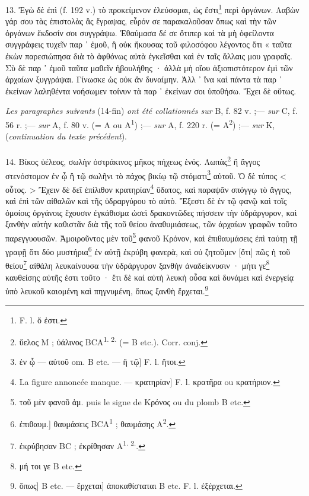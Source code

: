 \documentclass[a4paper, 11pt, oneside, polutonikogreek, french]{article}
\begin{document}
13. Ἐγὼ δὲ ἐπὶ (f. 192 v.) τὸ προκείμενον ἐλεύσομαι, ὡς ἔστι\footnote{F. l. ὅ ἐστι.} περὶ ὀργάνων. Λαβὼν γάρ σου τὰς ἐπιστολὰς ἃς ἔγραψας, εὗρόν σε παρακαλοῦσαν ὅπως καὶ τὴν τῶν ὀργάνων ἔκδοσίν σοι συγγράψω. Ἐθαύμασα δέ σε ὅτιπερ καὶ τὰ μὴ ὀφείλοντα συγγράφεις τυχεῖν παρ ᾽ ἐμοῦ, ἢ οὐκ ἤκουσας τοῦ φιλοσόφου λέγοντος ὅτι « ταῦτα ἐκὼν παρεσιώπησα διὰ τὸ ἀφθόνως αὐτὰ ἐγκεῖσθαι καὶ ἐν ταῖς ἄλλαις μου γραφαῖς. Σὺ δὲ παρ ᾽ ἐμοῦ ταῦτα μαθεῖν ἠβουλήθης · ἀλλὰ μὴ οἴου ἀξιοπιστότερον ἐμὶ τῶν ἀρχαίων ξυγγράψαι. Γίνωσκε ὡς οὐκ ἂν δυναίμην. Ἀλλ ᾽ ἵνα καὶ πάντα τὰ παρ ᾽ ἐκείνων λαληθέντα νοήσωμεν τοίνυν τὰ παρ ᾽ ἐκείνων σοι ὑποθήσω. Ἔχει δὲ οὕτως.
\begin{center}
\emph{Les paragraphes suiνants} (14-fin) \emph{ont été collationnés sur} B, f. 82 v. ;--- \emph{sur} C, f. 56 r. ;--- \emph{sur} A, f. 80 v. (= A ou A\textsuperscript{1}) ;--- \emph{sur} A, f. 220 r. (= A\textsuperscript{2}) ;--- \emph{sur} K, (\emph{continuation du texte précédent}).
\end{center}
\paragraph{}
14. Βίκος ὑέλεος, σωλὴν ὀστράκινος μῆκος πήχεως ἑνός. Λωπὰς\footnote{ὕελος M ; ὑάλινος BCA\textsuperscript{1. 2.} (= B etc.). Corr. conj.} ἢ ἄγγος στενόστομον ἐν ᾧ ἢ τῷ σωλῆνι τὸ πάχος βικίῳ τῷ στόματι\footnote{ἐν ᾧ --- αὐτοῦ om. B etc. --- ἢ τῷ] F. l. ἤτοι.} αὐτοῦ. Ὁ δὲ τύπος < οὗτος. > Ἔχειν δὲ δεῖ ἐπίλιθον κρατηρίαν\footnote{La figure annoncée manque. --- κρατηρίαν] F. l. κρατῆρα ou κρατήριον.} ὕδατος, καὶ παραψᾶν σπόγγῳ τὸ ἄγγος, καὶ ἐπὶ τῶν αἰθαλῶν καὶ τῆς ὑδραργύρου τὸ αὐτὸ. Ἔξεστι δὲ ἐν τῷ φανῷ καὶ τοῖς ὁμοίοις ὀργάνοις ἔχουσιν ἐγκάθισμα ὡσεὶ δρακοντῶδες πήσσειν τὴν ὑδράργυρον, καὶ ξανθὴν αὐτὴν καθιστᾶν διὰ τῆς τοῦ θείου ἀναθυμιάσεως, τῶν ἀρχαίων γραφῶν τοῦτο παρεγγυουσῶν. Ἀμοιροῦντος μὲν τοῦ\footnote{τοῦ μὲν φανοῦ ἀμ. puis le signe de Κρόνος ou du plomb B etc.} φανοῦ Κρόνον, καὶ ἐπιθαυμάσεις ἐπὶ ταύτῃ τῇ γραφῇ ὅτι δύο μυστήρια\footnote{ἐπιθαυμ.] θαυμάσεις BCA\textsuperscript{1} ; θαυμάσης A\textsuperscript{2}.} ἐν αὐτῇ ἐκρύβη φανερὰ, καὶ οὐ ζητοῦμεν [ὅτι] πῶς ἡ τοῦ θείου\footnote{ἐκρύβησαν BC ; ἐκρίθησαν A\textsuperscript{1. 2.}.} αἰθάλη λευκαίνουσα τὴν ὑδράργυρον ξανθὴν ἀναδείκνυσιν · μήτι γε\footnote{μή τοι γε B etc.} καυθείσης αὐτῆς ἐστι τοῦτο · ἔτι δὲ καὶ αὐτὴ λευκὴ οὖσα καὶ δυνάμει καὶ ἐνεργείᾳ ὑπὸ λευκοῦ καιομένη καὶ πηγνυμένη, ὅπως ξανθὴ ἔρχεται.\footnote{ὅπως] B etc. --- ἔρχεται] ἀποκαθίσταται B etc. F. l. ἐξέρχεται.}
\end{document}
